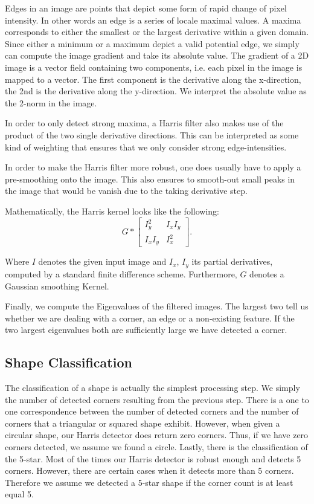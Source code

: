 \documentclass[conference]{IEEEtran}
\begin{document}
Edges in an image are points that depict some form of rapid change of pixel intensity.
 In other words an edge is a series of locale maximal values. 
 A maxima corresponds to either the smallest or the largest derivative within a given domain. 
 Since either a minimum or a maximum depict a valid potential edge, we simply can compute the image gradient and take its absolute value. 
 The gradient of a 2D image is a vector field containing two components, i.e. each pixel in the image is mapped to a vector. 
 The first component is the derivative along the x-direction, the 2nd is the derivative along the y-direction. 
 We interpret the absolute value as the 2-norm in the image. 

In order to only detect strong maxima, a Harris filter also makes use of the product of the two single derivative directions. 
This can be interpreted as some kind of weighting that ensures that we only consider strong edge-intensities. 

In order to make the Harris filter more robust, one does usually have to apply a pre-smoothing onto the image. This also ensures to smooth-out small peaks in the image that would be vanish due to the taking derivative step. 

Mathematically, the Harris kernel looks like the following: 
\begin{equation}
G * 
\begin{bmatrix}
 I_y^2  & I_x I_y \\
 I_x I_y & I_x^2
\end{bmatrix}
.
\end{equation}

Where $I$ denotes the given input image and $I_x$, $I_y$ its partial derivatives, computed by a standard finite difference scheme. Furthermore, $G$ denotes a Gaussian smoothing Kernel. 

Finally, we compute the Eigenvalues of the filtered images. The largest two tell us whether we are dealing with a corner, an edge or a non-existing feature. If the two largest eigenvalues both are sufficiently large we have detected a corner.

\subsection{Shape Classification}
The classification of a shape is actually the simplest processing step. We simply the number of detected corners resulting from the previous step. There is a one to one correspondence between the number of detected corners and the number of corners that a triangular or squared shape exhibit. However, when given a circular shape, our Harris detector does return zero corners. Thus, if we have zero corners detected, we assume we found a circle. Lastly, there is the classification of the 5-star. Most of the times our Harris detector is robust enough and detects 5 corners. However, there are certain cases when it detects more than 5 corners. Therefore we assume we detected a 5-star shape if the corner count is at least equal 5.
\end{document}
